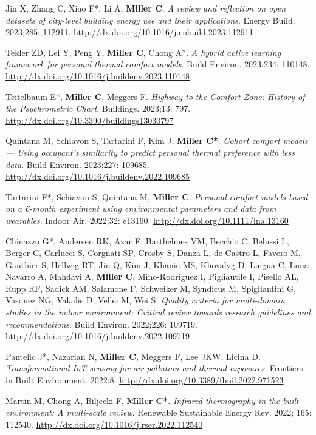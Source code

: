 \documentclass[10pt,a4paper]{article}
\begin{document}
\begin{small}
\begin{etaremune}
Jin X, Zhang C, Xiao F*, Li A, \textbf{Miller C}. \emph{A review and reflection on open datasets of city-level building energy use and their applications}. Energy Build. 2023;285: 112911. \url{http://dx.doi.org/10.1016/j.enbuild.2023.112911}
\item
Tekler ZD, Lei Y, Peng Y, \textbf{Miller C}, Chong A*. \emph{A hybrid active learning framework for personal thermal comfort models}. Build Environ. 2023;234: 110148. \url{http://dx.doi.org/10.1016/j.buildenv.2023.110148}
\item
Teitelbaum E*, \textbf{Miller C}, Meggers F. \emph{Highway to the Comfort Zone: History of the Psychrometric Chart}. Buildings. 2023;13: 797. \url{http://dx.doi.org/10.3390/buildings13030797}
\item
Quintana M, Schiavon S, Tartarini F, Kim J, \textbf{Miller C*}. \emph{Cohort comfort models — Using occupant’s similarity to predict personal thermal preference with less data}. Build Environ. 2023;227: 109685. \url{http://dx.doi.org/10.1016/j.buildenv.2022.109685}
\item
Tartarini F*, Schiavon S, Quintana M, \textbf{Miller C}. \emph{Personal comfort models based on a 6-month experiment using environmental parameters and data from wearables}. Indoor Air. 2022;32: e13160. \url{http://dx.doi.org/10.1111/ina.13160}
\item
Chinazzo G*, Andersen RK, Azar E, Barthelmes VM, Becchio C, Belussi L, Berger C, Carlucci S, Corgnati SP, Crosby S, Danza L, de Castro L, Favero M, Gauthier S, Hellwig RT, Jin Q, Kim J, Khanie MS, Khovalyg D, Lingua C, Luna-Navarro A, Mahdavi A, \textbf{Miller C}, Mino-Rodriguez I, Pigliautile I, Pisello AL, Rupp RF, Sadick AM, Salamone F, Schweiker M, Syndicus M, Spigliantini G, Vasquez NG, Vakalis D, Vellei M, Wei S. \emph{Quality criteria for multi-domain studies in the indoor environment: Critical review towards research guidelines and recommendations}. Build Environ. 2022;226: 109719. \url{http://dx.doi.org/10.1016/j.buildenv.2022.109719}%
\item
Pantelic J*, Nazarian N, \textbf{Miller C}, Meggers F, Lee JKW, Licina D. \emph{Transformational IoT sensing for air pollution and thermal exposures}. Frontiers in Built Environment. 2022;8. \url{http://dx.doi.org/10.3389/fbuil.2022.971523}
\item
Martin M, Chong A, Biljecki F, \textbf{Miller C*}. \emph{Infrared thermography in the built environment: A multi-scale review}. Renewable Sustainable Energy Rev. 2022; 165: 112540. \url{http://dx.doi.org/10.1016/j.rser.2022.112540}

\end{etaremune}
\end{small}
\end{document}
